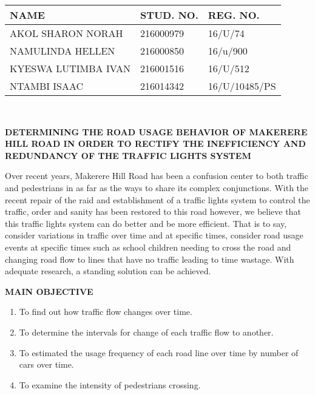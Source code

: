 \documentclass[11pt,a4paper,final]{report}
\begin{document}

\noindent
\begin{tabular}{|p{2.0in}|p{1.0in}|p{1.3in}|} \hline 
\textbf{NAME} & \textbf{STUD. NO.} & \textbf{REG. NO.} \\ \hline 
AKOL SHARON NORAH & 216000979 & 16/U/74 \\ \hline 
NAMULINDA HELLEN & 216000850 & 16/u/900  \\ \hline 
KYESWA LUTIMBA IVAN & 216001516 & 16/U/512  \\ \hline 
NTAMBI ISAAC & 216014342 & 16/U/10485/PS  \\ \hline 
\end{tabular} \\

\textbf{}

\noindent \textbf{DETERMINING THE ROAD USAGE BEHAVIOR OF MAKERERE HILL ROAD IN ORDER TO RECTIFY THE INEFFICIENCY AND REDUNDANCY OF THE TRAFFIC LIGHTS SYSTEM} \\

\noindent 

\noindent Over recent years, Makerere Hill Road has been a confusion center to both traffic and pedestrians in as far as the ways to share its complex conjunctions. With the recent repair of the raid and establishment of a traffic lights system to control the traffic, order and sanity has been restored to this road however, we believe that this traffic lights system can do better and be more efficient. That is to say, consider variations in traffic over time and at specific times, consider road usage events at specific times such as school children needing to cross the road and changing road flow to lines that have no traffic leading to time wastage. With adequate research, a standing solution can be achieved. \\

\noindent 

\noindent \textbf{MAIN OBJECTIVE}

\begin{enumerate}
\item \textbf{ }To find out how traffic flow changes over time.

\item  To determine the intervals for change of each traffic flow to another.

\item  To estimated the usage frequency of each road line over time by number of cars over time.

\item  To examine the intensity of pedestrians crossing.
\end{enumerate}
\end{document}
